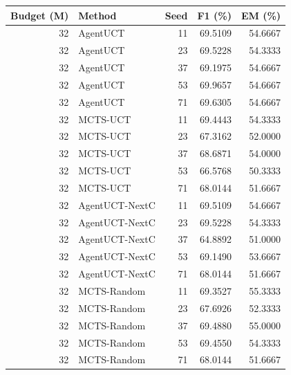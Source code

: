 \begin{tabular}{rlrrr}
\toprule
Budget (M) & Method & Seed & F1 (\%) & EM (\%) \\
\midrule
32 & AgentUCT & 11 & 69.5109 & 54.6667 \\
32 & AgentUCT & 23 & 69.5228 & 54.3333 \\
32 & AgentUCT & 37 & 69.1975 & 54.6667 \\
32 & AgentUCT & 53 & 69.9657 & 54.6667 \\
32 & AgentUCT & 71 & 69.6305 & 54.6667 \\
32 & MCTS-UCT & 11 & 69.4443 & 54.3333 \\
32 & MCTS-UCT & 23 & 67.3162 & 52.0000 \\
32 & MCTS-UCT & 37 & 68.6871 & 54.0000 \\
32 & MCTS-UCT & 53 & 66.5768 & 50.3333 \\
32 & MCTS-UCT & 71 & 68.0144 & 51.6667 \\
32 & AgentUCT-NextC & 11 & 69.5109 & 54.6667 \\
32 & AgentUCT-NextC & 23 & 69.5228 & 54.3333 \\
32 & AgentUCT-NextC & 37 & 64.8892 & 51.0000 \\
32 & AgentUCT-NextC & 53 & 69.1490 & 53.6667 \\
32 & AgentUCT-NextC & 71 & 68.0144 & 51.6667 \\
32 & MCTS-Random & 11 & 69.3527 & 55.3333 \\
32 & MCTS-Random & 23 & 67.6926 & 52.3333 \\
32 & MCTS-Random & 37 & 69.4880 & 55.0000 \\
32 & MCTS-Random & 53 & 69.4550 & 54.3333 \\
32 & MCTS-Random & 71 & 68.0144 & 51.6667 \\
\bottomrule
\end{tabular}
